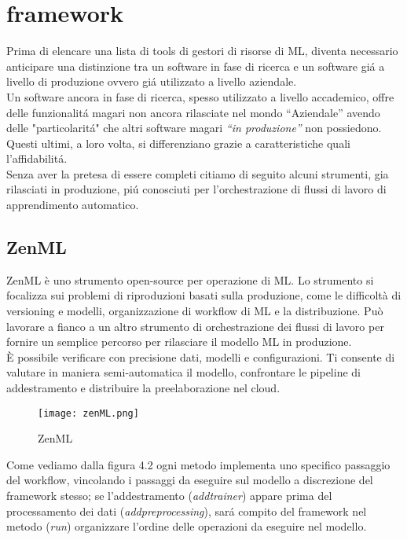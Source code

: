 \documentclass[../tesi.tex]{subfiles}
\begin{document}
\section{\Gls{framework}}
  Prima di elencare una lista di tools di gestori di risorse di ML, diventa necessario anticipare una distinzione tra un software in fase di ricerca e un software giá a livello di produzione ovvero giá utilizzato a livello aziendale.\\
  Un software ancora in fase di ricerca, spesso utilizzato a livello accademico, offre delle funzionalitá magari non ancora rilasciate nel mondo ``Aziendale'' avendo delle "particolaritá" che altri software magari \textit{``in produzione''} non possiedono.\\
  Questi ultimi, a loro volta, si differenziano grazie a caratteristiche quali l'affidabilitá.\\
  Senza aver la pretesa di essere completi citiamo di seguito alcuni strumenti, gia rilasciati in produzione, piú conosciuti per l'orchestrazione di flussi di lavoro di apprendimento automatico.
\subsection{ZenML} 
  ZenML è uno strumento open-source per operazione di ML.
  Lo strumento si focalizza sui problemi di riproduzioni basati sulla produzione, come le difficoltà di versioning e modelli, organizzazione di workflow di ML e la distribuzione. Può lavorare a fianco a un altro strumento di orchestrazione dei flussi di lavoro per fornire un semplice percorso per rilasciare il modello ML in produzione.\\
  È possibile verificare con precisione dati, modelli e configurazioni. Ti consente di valutare in maniera semi-automatica il modello, confrontare le pipeline di addestramento e distribuire la preelaborazione nel cloud.
  
\begin{figure}[htbp]
\centering
\texttt{[image: zenML.png]} 
\caption{ZenML}
\end{figure}
  Come vediamo dalla figura 4.2 ogni metodo implementa uno specifico passaggio del workflow, vincolando i passaggi da eseguire sul modello a discrezione del \Gls{framework} stesso; se l'addestramento (\textit{add\textunderscore trainer}) appare prima del processamento dei dati (\textit{add\textunderscore preprocessing}), sará compito del framework nel metodo (\textit{run}) organizzare l'ordine delle operazioni da eseguire nel modello.
  
\end{document}
